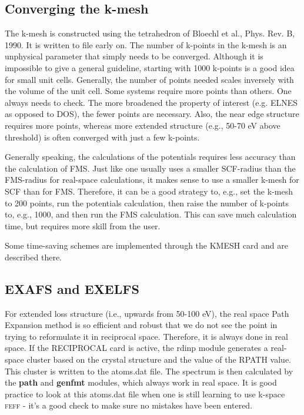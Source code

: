 \documentclass[11pt,oneside]{report} %
\newcommand{\program}[1]{\textsc{#1}}
\newcommand{\feff}{\program{feff}}
\newcommand{\module}[1]{\textrm{\bf{#1}}}
\begin{document}
\subsection{Converging the k-mesh}
The k-mesh is constructed using the tetrahedron of Bloechl et al., Phys. Rev. B, 1990.  It is written to file early on.
The number of k-points in the k-mesh is an unphysical parameter that simply needs to be converged.  Although it is impossible to give a general guideline, starting with 1000 k-points is a good idea for small unit cells.  Generally, the number of points needed scales inversely with the volume of the unit cell.  Some systems require more points than others.  One always needs to check.  The more broadened the property of interest (e.g. ELNES as opposed to DOS), the fewer points are necessary.  Also, the near edge structure requires more points, whereas more extended structure (e.g., 50-70 eV above threshold) is often converged with just a few k-points.

Generally speaking, the calculations of the potentials requires less accuracy than the calculation of FMS.  Just like one usually uses a smaller SCF-radius than the FMS-radius for real-space calculations, it makes sense to use a smaller k-mesh for SCF than for FMS.  Therefore, it can be a good strategy to, e.g., set the k-mesh to 200 points, run the potentials calculation, then raise the number of k-points to, e.g., 1000, and then run the FMS calculation.  This can save much calculation time, but requires more skill from the user.

Some time-saving schemes are implemented through the KMESH card and are described there.

\subsection{EXAFS and EXELFS}
For extended loss structure (i.e., upwards from 50-100 eV), the real space Path Expansion method is so efficient and robust that we do not see the point in trying to reformulate it in reciprocal space.  Therefore, it is always done in real space.
If the RECIPROCAL card is active, the rdinp module generates a real-space cluster based on the crystal structure and the value of the RPATH value.  This cluster is written to the atoms.dat file.  The spectrum is then calculated by the \module{path} and \module{genfmt} modules, which always work in real space.
It is good practice to look at this atoms.dat file when one is still learning to use k-space {\feff} - it's a good check to make sure no mistakes have been entered.
\end{document}
